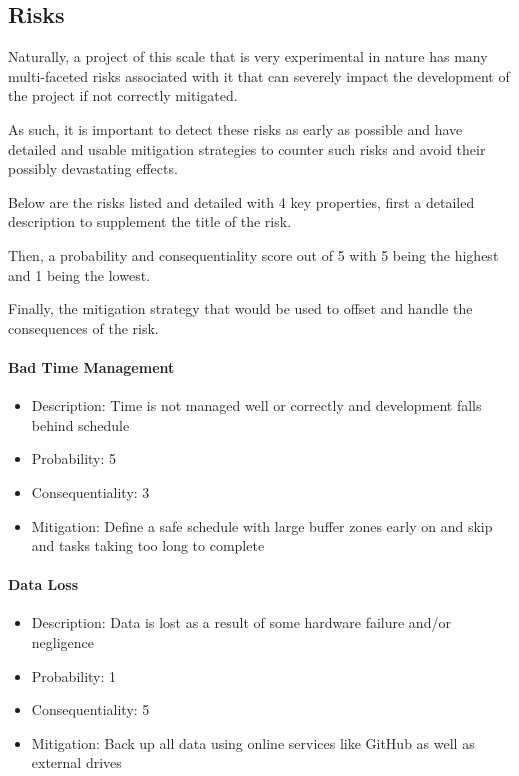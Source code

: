 \documentclass[12pt]{article}
\newcommand{\sentence}{} %
\begin{document}
    \pagebreak

    \subsection{Risks}\label{subsec:risks}

    \tab
    Naturally, a project of this scale that is very experimental in nature has many multi-faceted risks
    associated with it that can severely impact the development of the project if not correctly mitigated.
    \sentence
    As such, it is important to detect these risks as early as possible and have detailed and usable mitigation
    strategies to counter such risks and avoid their possibly devastating effects.
    \sentence
    Below are the risks listed and detailed with 4 key properties, first a detailed description to supplement the
    title of the risk.
    \sentence
    Then, a probability and consequentiality score out of 5 with 5 being the highest and 1 being the lowest.
    \sentence
    Finally, the mitigation strategy that would be used to offset and handle the consequences of the risk.

    \paragraph{Bad Time Management}
    \begin{itemize}
        \item Description: Time is not managed well or correctly and development falls behind schedule
        \item Probability: 5
        \item Consequentiality: 3
        \item Mitigation: Define a safe schedule with large buffer zones early on and skip and tasks taking too long
        to complete
    \end{itemize}

    \paragraph{Data Loss}
    \begin{itemize}
        \item Description: Data is lost as a result of some hardware failure and/or negligence
        \item Probability: 1
        \item Consequentiality: 5
        \item Mitigation: Back up all data using online services like GitHub as well as external drives
    \end{itemize}
\end{document}
